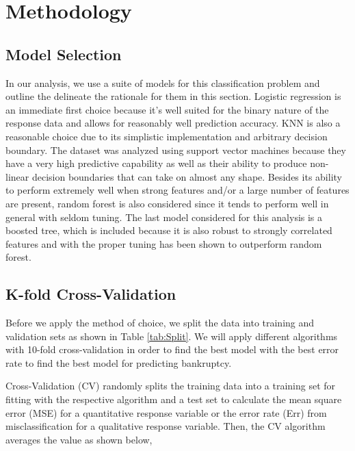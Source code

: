 \documentclass[12pt]{report}
\begin{document}
\begingroup
\renewcommand{\cleardoublepage}{}
\renewcommand{\clearpage}{}

\chapter{Methodology} %
\endgroup

\section{Model Selection}

In our analysis, we use a suite of models for this classification problem and outline the delineate the rationale for them in this section. Logistic regression is an immediate first choice because it's well suited for the binary nature of the response data and allows for reasonably well prediction accuracy. KNN is also a reasonable choice due to its simplistic implementation and arbitrary decision boundary. The dataset was analyzed using support vector machines because they have a very high predictive capability as well as their ability to produce non-linear decision boundaries that can take on almost any shape. Besides its ability to perform extremely well when strong features and/or a large number of features are present, random forest is also considered since it tends to perform well in general with seldom tuning. The last model considered for this analysis is a boosted tree, which is included because it is also robust to strongly correlated features and with the proper tuning has been shown to outperform random forest. 


\section{K-fold Cross-Validation}
Before we apply the method of choice, we split the data into training and validation sets as shown in Table \ref{tab:Split}. We will apply different algorithms with 10-fold cross-validation in order to find the best model with the best error rate to find the best model for predicting bankruptcy.

Cross-Validation (CV) randomly splits the training data into a training set for fitting with the respective algorithm and a test set to calculate the mean square error (MSE) for a quantitative response variable or the error rate (Err) from misclassification for a qualitative response variable. Then, the CV algorithm averages the value as shown below,
\end{document}
